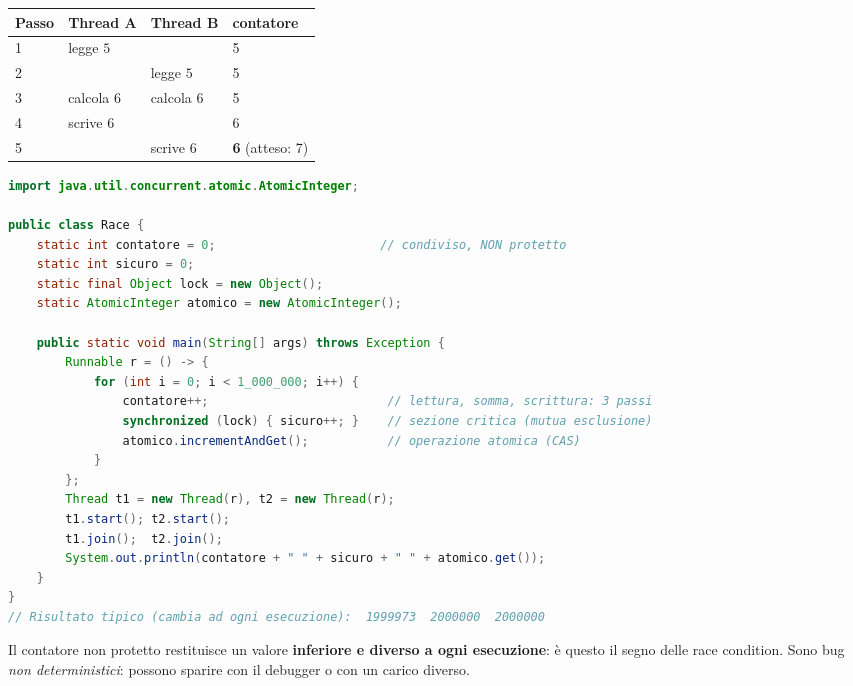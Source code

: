 \begin{center}
\small
\begin{tabular}{@{}llll@{}}
\toprule
\textbf{Passo} & \textbf{Thread A} & \textbf{Thread B} & \textbf{contatore} \\
\midrule
1 & legge $5$ & & 5 \\
2 & & legge $5$ & 5 \\
3 & calcola $6$ & calcola $6$ & 5 \\
4 & scrive $6$ & & 6 \\
5 & & scrive $6$ & \textbf{6} (atteso: 7) \\
\bottomrule
\end{tabular}
\end{center}

\begin{lstlisting}[language=Java, caption={Race condition e tre rimedi in Java}]
import java.util.concurrent.atomic.AtomicInteger;

public class Race {
    static int contatore = 0;                       // condiviso, NON protetto
    static int sicuro = 0;
    static final Object lock = new Object();
    static AtomicInteger atomico = new AtomicInteger();

    public static void main(String[] args) throws Exception {
        Runnable r = () -> {
            for (int i = 0; i < 1_000_000; i++) {
                contatore++;                         // lettura, somma, scrittura: 3 passi
                synchronized (lock) { sicuro++; }    // sezione critica (mutua esclusione)
                atomico.incrementAndGet();           // operazione atomica (CAS)
            }
        };
        Thread t1 = new Thread(r), t2 = new Thread(r);
        t1.start(); t2.start();
        t1.join();  t2.join();
        System.out.println(contatore + " " + sicuro + " " + atomico.get());
    }
}
// Risultato tipico (cambia ad ogni esecuzione):  1999973  2000000  2000000
\end{lstlisting}
Il contatore non protetto restituisce un valore \textbf{inferiore e diverso a ogni esecuzione}: è questo il segno delle race condition. Sono bug \emph{non deterministici}: possono sparire con il debugger o con un carico diverso.

